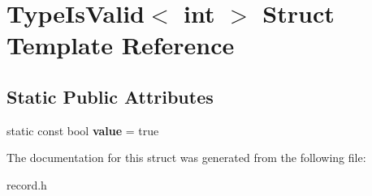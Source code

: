 \hypertarget{struct_type_is_valid_3_01int_01_4}{\section{Type\-Is\-Valid$<$ int $>$ Struct Template Reference}
\label{struct_type_is_valid_3_01int_01_4}
}
\subsection*{Static Public Attributes}
\begin{DoxyCompactItemize}
\item 
\hypertarget{struct_type_is_valid_3_01int_01_4_a72938ec96190ff98ef01c1403e6fe8e8}{static const bool {\bfseries value} = true}\label{struct_type_is_valid_3_01int_01_4_a72938ec96190ff98ef01c1403e6fe8e8}

\end{DoxyCompactItemize}


The documentation for this struct was generated from the following file\-:\begin{DoxyCompactItemize}
\item 
record.\-h\end{DoxyCompactItemize}
